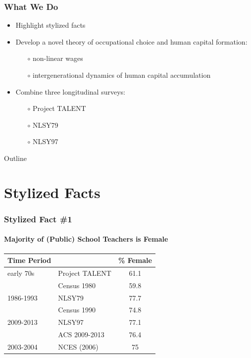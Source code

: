 \documentclass[11pt]{beamer}
\begin{document}
	\begin{frame}
		\frametitle{What We Do}
		\vfill
		\begin{itemize}
			\item Highlight stylized facts
			\vfill
			\item Develop a novel theory of occupational choice and human capital formation: 
			\begin{itemize}
				\item[$\circ$] non-linear wages %
				\item[$\circ$] intergenerational dynamics of human capital accumulation
			\end{itemize}
			\vfill
			\item Combine three longitudinal surveys: 
			\begin{itemize}
				\item[$\circ$] Project TALENT
				\item[$\circ$] NLSY79
				\item[$\circ$] NLSY97
            \end{itemize}
		\end{itemize}
		\vfill
	\end{frame}

 \begin{frame}{Outline}
\tableofcontents{}
\end{frame}

 \section{Stylized Facts}
	\begin{frame}
		\frametitle{Stylized Fact \#1}
		\framesubtitle{Majority of (Public) School Teachers is Female}
		\begin{table}[h!]
			\centering 
			\begin{tabular}{l l c }
				\toprule
				Time Period & & \% Female \\
				\midrule
                early 70s & Project TALENT  &  61.1 \\
                & Census 1980 &  59.8 \\
                1986-1993 & NLSY79  & 77.7   \\
                & Census 1990 & 74.8 \\
                2009-2013& NLSY97  & 77.1   \\
                & ACS 2009-2013  & 76.4  \\
				\midrule
				2003-2004 & NCES (2006) & 75\\
				\bottomrule
			\end{tabular}
		\end{table}
	\end{frame}
	
\end{document}
